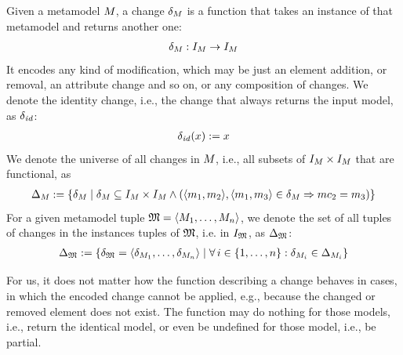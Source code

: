 \begin{definition}[Change]
    Given a metamodel $M_{}$, a change $\delta_{M_{}}$ is a function that takes an instance of that metamodel and returns another one:
    \begin{align*}
        \delta_{M_{}}: I_{M_{}} \rightarrow I_{M_{}}
    \end{align*}
    It encodes any kind of modification, which may be just an element addition, or removal, an attribute change and so on, or any composition of changes.
    We denote the identity change, i.e., the change that always returns the input model, as $\delta_{\mathit{id}}$:
    \begin{align*}
        \delta_{\mathit{id}}(x) := x
    \end{align*}
    We denote the universe of all changes in $M_{}$, i.e., all subsets of $I_{M_{}} \times I_{M_{}}$ that are functional, as 
    \begin{align*}
        \Delta_{M_{}} := \{ \delta_{M_{}} \mid \delta_{M_{}} \subseteq I_{M_{}} \times I_{M_{}} \land
        (\langle m_{1}, m_{2} \rangle, \langle m_{1}, m_{3} \rangle \in \delta_{M_{}} \Rightarrow mc_{2} = m_{3}) \}
    \end{align*}
    For a given metamodel tuple $\mathfrak{M} = \langle M_{1}, \dots, M_{n} \rangle$, we denote the set of all tuples of changes in the instances tuples of 
    $\mathfrak{M}$, i.e. in $I_{\mathfrak{M}}$, as $\Delta_{\mathfrak{M}}$:
    \begin{align*}
        \changeuniverse{\metamodeltuple{M}} \equalsperdefinition \setted{ \changetuple{\metamodeltuple{M}} = \tupled{\change{\metamodel{M}{1}}, \dots, \change{\metamodel{M}{n}}} \mid \forall i \in \setted{1,\dots,n} : \change{\metamodel{M}{i}} \in \changeuniverse{\metamodel{M}{i}} } 
    \end{align*}
\end{definition}

For us, it does not matter how the function describing a change behaves in cases, in which the encoded change cannot be applied, e.g., because the changed or removed element does not exist. The function may do nothing for those models, i.e., return the identical model, or even be undefined for those model, i.e., be partial.

